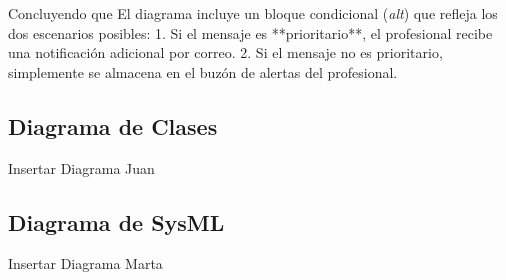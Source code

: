 \documentclass{article}
\begin{document}
Concluyendo que El diagrama incluye un bloque condicional (\textit{alt}) que refleja los dos escenarios posibles:
1. Si el mensaje es **prioritario**, el profesional recibe una notificación adicional por correo.
2. Si el mensaje no es prioritario, simplemente se almacena en el buzón de alertas del profesional.



\subsection{Diagrama de Clases}

Insertar Diagrama Juan

\subsection{Diagrama de SysML}

Insertar Diagrama Marta
\end{document}
